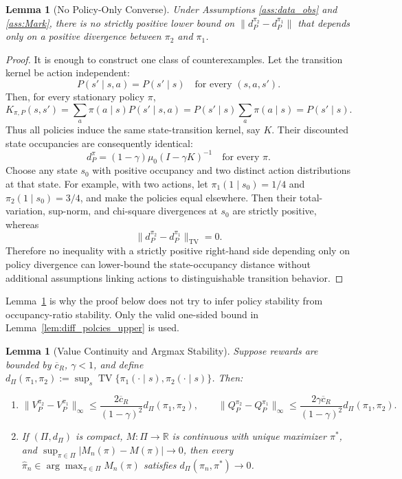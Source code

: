 \documentclass[12pt]{article}
\newtheorem{lemma}[theorem]{Lemma}
\theoremstyle{remark}\newtheorem{remark}[theorem]{Remark}\theoremstyle{plain}
\begin{document}
\begin{lemma}[No Policy-Only Converse]\label{lem:diff_polcies_lower}
    Under Assumptions \ref{ass:data_obs} and \ref{ass:Mark}, there is
    no strictly positive lower bound on
    $\|d_P^{\pi_2}-d_P^{\pi_1}\|$ that depends only on a positive
    divergence between $\pi_2$ and $\pi_1$.
\end{lemma}

\begin{proof}
    It is enough to construct one class of counterexamples.  Let the
    transition kernel be action independent:
    \[
        P(s'\mid s,a)=P(s'\mid s)
        \quad\text{for every }(s,a,s').
    \]
    Then, for every stationary policy $\pi$,
    \[
        K_{\pi,P}(s,s')
        =\sum_a\pi(a\mid s)P(s'\mid s,a)
        =P(s'\mid s)\sum_a\pi(a\mid s)
        =P(s'\mid s).
    \]
    Thus all policies induce the same state-transition kernel, say
    $K$.  Their discounted state occupancies are consequently
    identical:
    \[
        d_P^\pi
        =(1-\gamma)\mu_0(I-\gamma K)^{-1}
        \quad\text{for every }\pi.
    \]
    Choose any state $s_0$ with positive occupancy and two distinct
    action distributions at that state.  For example, with two
    actions, let
    $\pi_1(1\mid s_0)=1/4$ and
    $\pi_2(1\mid s_0)=3/4$, and make the policies equal elsewhere.
    Then their total-variation, sup-norm, and chi-square divergences
    at $s_0$ are strictly positive, whereas
    \[
        \|d_P^{\pi_2}-d_P^{\pi_1}\|_{\mathrm{TV}}=0.
    \]
    Therefore no inequality with a strictly positive right-hand side
    depending only on policy divergence can lower-bound the
    state-occupancy distance without additional assumptions linking
    actions to distinguishable transition behavior.
\end{proof}

Lemma~\ref{lem:diff_polcies_lower} is why the proof below does not try
to infer policy stability from occupancy-ratio stability.  Only the
valid one-sided bound in Lemma~\ref{lem:diff_polcies_upper} is used.%


\begin{lemma}[Value Continuity and Argmax Stability]
\label{lem:diff_pol_to_Q_fun}
    Suppose rewards are bounded by $\overline c_R$, $\gamma<1$, and
    define
    $d_\Pi(\pi_1,\pi_2)
      :=\sup_s\operatorname{TV}\{\pi_1(\cdot\mid s),
      \pi_2(\cdot\mid s)\}$.
    Then:
    \begin{enumerate}
        \item
        \[
            \|V_P^{\pi_2}-V_P^{\pi_1}\|_\infty
            \leq
            \frac{2\overline c_R}{(1-\gamma)^2}
            d_\Pi(\pi_1,\pi_2),
            \qquad
            \|Q_P^{\pi_2}-Q_P^{\pi_1}\|_\infty
            \leq
            \frac{2\gamma\overline c_R}{(1-\gamma)^2}
            d_\Pi(\pi_1,\pi_2).
        \]
        \item If $(\Pi,d_\Pi)$ is compact, $M:\Pi\to\mathbb R$ is
        continuous with unique maximizer $\pi^*$, and
        $\sup_{\pi\in\Pi}|M_n(\pi)-M(\pi)|\to0$, then every
        $\widehat\pi_n\in\arg\max_{\pi\in\Pi}M_n(\pi)$ satisfies
        $d_\Pi(\widehat\pi_n,\pi^*)\to0$.
    \end{enumerate}
\end{lemma}
\end{document}

